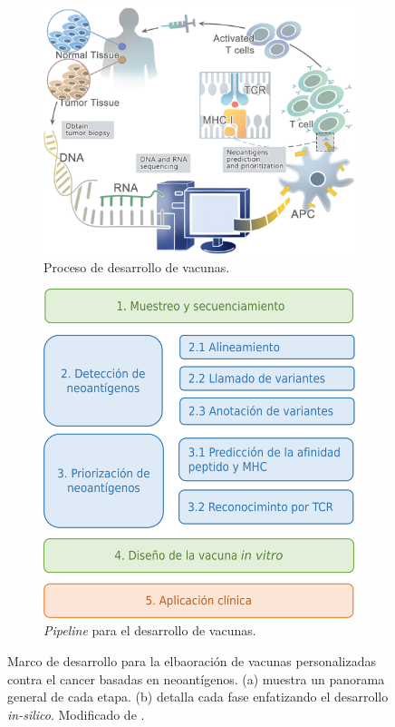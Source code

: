 \documentclass[a4paper]{article}
\begin{document}
\begin{figure}[h]
	\centering
	\begin{subfigure}[b]{0.52\textwidth}
		\centering
		\includegraphics[width=\textwidth]{../img/vaccines/vaccine_pipeline}
		\caption{Proceso de desarrollo de vacunas.}
		\label{fig:vaccines_a}
	\end{subfigure}
	\hfill
	\begin{subfigure}[b]{0.44\textwidth}
		\centering
		\includegraphics[width=\textwidth]{../img/vaccines/pipeline}
		\caption{\textit{Pipeline} para el desarrollo de vacunas.}
		\label{fig:vaccines_b}
	\end{subfigure}
	
	\caption{Marco de desarrollo para la elbaoración de vacunas personalizadas contra el cancer basadas en neoantígenos. (a) muestra un panorama general de cada etapa. (b) detalla cada fase enfatizando el desarrollo \textit{in-silico}.  Modificado de \cite{han2020progress}.}
	\label{fig:vaccines}
\end{figure}
	
\end{document}
